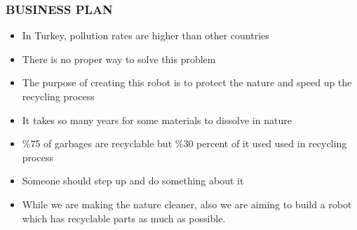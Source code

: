 \documentclass{beamer}
\begin{document}
 \begin{frame}
  \frametitle{BUSINESS PLAN}
  \begin{itemize}
   \item In Turkey, pollution rates are higher than other countries
   \item There is no proper way to solve this problem
   \item The purpose of creating this robot is to protect the nature and speed up the recycling process
   \item It takes so many years for some materials to dissolve in nature
   \item \%75 of garbages are recyclable but \%30 percent of it used used in recycling process
   \item Someone should step up and do something about it
   \item While we are making the nature cleaner, also we are aiming to build a robot which has recyclable parts as much as possible.
  \end{itemize}
 \end{frame}
 
\end{document}
